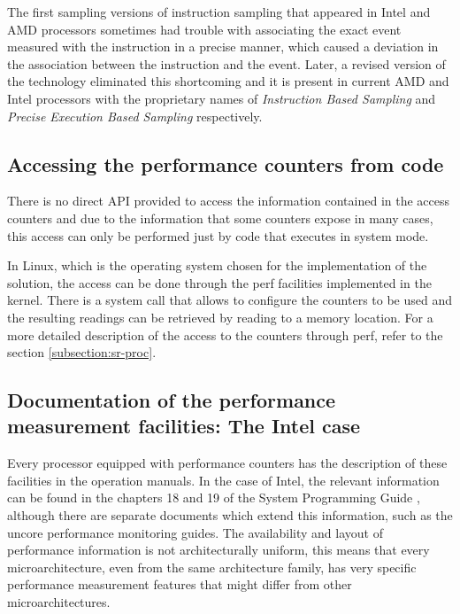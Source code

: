The first sampling versions of instruction sampling that appeared in Intel and AMD processors sometimes had trouble with associating the exact event measured with the instruction in a precise manner, which caused a deviation in the association between the instruction and the event. Later, a revised version of the technology eliminated this shortcoming and it is present in current AMD and Intel processors with the proprietary names of \textit{Instruction Based Sampling} \cite{amd-ibs} and \textit{Precise Execution Based Sampling}  respectively. 

\subsection{Accessing the performance counters from code}\label{subsection:accessing-code}

There is no direct API provided to access the information contained in the access counters and due to the information that some counters expose in many cases, this access can only be performed just by code that executes in system mode.

In Linux, which is the operating system chosen for the implementation of the solution, the access can be done through the perf facilities implemented in the kernel. There is a system call that allows to configure the counters to be used and the resulting readings can be retrieved by reading to a memory location. For a more detailed description of the access to the counters through perf, refer to the section \ref{subsection:sr-proc}. 

\subsection{Documentation of the performance measurement facilities: The Intel case }\label{subsection:performance-documentation}

Every processor equipped with performance counters has the description of these facilities in the operation manuals. In the case of Intel, the relevant information can be found in the chapters 18 and 19 of the System Programming Guide \cite{intel-devguide}, although there are separate documents which extend this information, such as the uncore performance monitoring guides. The availability and layout of performance information is not architecturally uniform, this means that every microarchitecture, even from the same architecture family, has very specific performance measurement features that might differ from other microarchitectures.

